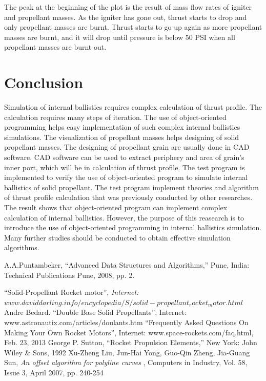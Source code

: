 \documentclass[conference]{IEEEtran}
\begin{document}
The peak at the beginning of the plot is the result of mass flow rates of igniter and propellant masses. As the igniter has gone out, thrust starts to drop and only propellant masses are burnt. Thrust starts to go up again as more propellant masses are burnt, and it will drop until pressure is below 50 PSI when all propellant masses are burnt out. 



\section{Conclusion}

Simulation of internal ballistics requires complex calculation of thrust profile. The calculation requires many steps of iteration. The use of object-oriented programming helps easy implementation of such complex internal ballistics simulations. The visualization of propellant masses helps designing of solid propellant masses. The designing of propellant grain are usually done in CAD software. CAD software can be used to extract periphery and area of grain's inner port, which will be in calculation of thrust profile. The test program is implemented to verify the use of object-oriented program to simulate internal ballistics of solid propellant. The test program implement theories and algorithm of thrust profile calculation that was previously conducted by other researches. The result shows that object-oriented program can implement complex calculation of internal ballistics. However, the purpose of this reasearch is to introduce the use of object-oriented programming in internal ballistics simulation. Many further studies should be conducted to obtain effective simulation algorithms.            


\begin{thebibliography}{100}


A.A.Puntambeker, “Advanced Data Structures and Algorithms,” Pune, India: Technical Publications Pune, 2008, pp. 2.

“Solid-Propellant Rocket motor”,\emph{ Internet:  $www.daviddarling.info/encyclopedia/S/solid-propellant_rocket_motor.html$}
Andre Bedard. “Double Base Solid Propellants”, Internet: www.astronautix.com/articles/doulants.htm 
“Frequently Asked Questions On Making Your Own Rocket Motors”, Internet: www.space-rockets.com/faq.html, Feb. 23, 2013
George P. Sutton, “Rocket Propulsion Elements,” New York: John Wiley \& Sons, 1992
Xu-Zheng Liu, Jun-Hai Yong, Guo-Qin Zheng, Jia-Guang Sun, {\em An offset algorithm for polyline curves }, Computers in Industry, Vol. 58, Issue 3, April 2007, pp. 240-254
\end{thebibliography}
\end{document}
